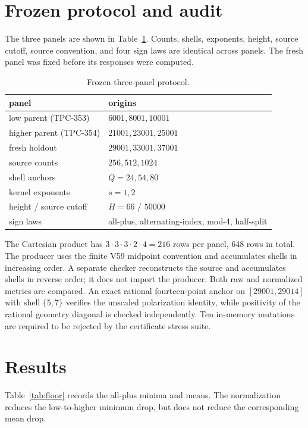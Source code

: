 \documentclass[10pt]{article}
\begin{document}
\section{Frozen protocol and audit}

The three panels are shown in Table~\ref{tab:protocol}.  Counts, shells,
exponents, height, source cutoff, source convention, and four sign laws are
identical across panels.  The fresh panel was fixed before its responses were
computed.

\begin{table}[h]
\centering\small
\caption{Frozen three-panel protocol.}
\label{tab:protocol}
\begin{tabular}{ll}
\toprule
panel & origins\\
\midrule
low parent (TPC-353) & $6001,8001,10001$\\
higher parent (TPC-354) & $21001,23001,25001$\\
fresh holdout & $29001,33001,37001$\\
\midrule
source counts & $256,512,1024$\\
shell anchors & $Q=24,54,80$\\
kernel exponents & $s=1,2$\\
height / source cutoff & $H=66$ / $50000$\\
sign laws & all-plus, alternating-index, mod-4, half-split\\
\bottomrule
\end{tabular}
\end{table}

The Cartesian product has $3\cdot3\cdot3\cdot2\cdot4=216$ rows per panel,
648 rows in total.  The producer uses the finite V59 midpoint convention and
accumulates shells in increasing order.  A separate checker reconstructs the
source and accumulates shells in reverse order; it does not import the
producer.  Both raw and normalized metrics are compared.  An exact rational
fourteen-point anchor on $[29001,29014]$ with shell $\{5,7\}$ verifies the
unscaled polarization identity, while positivity of the rational geometry
diagonal is checked independently.  Ten in-memory mutations are required to
be rejected by the certificate stress suite.

\section{Results}

Table~\ref{tab:floor} records the all-plus minima and means.  The normalization
reduces the low-to-higher minimum drop, but does not reduce the corresponding
mean drop.
\end{document}
